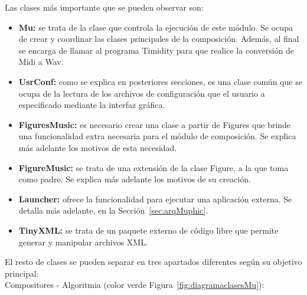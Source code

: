 Las clases más importante que se pueden observar son:

\begin{itemize}

	\item \textbf{Mu:} se trata de la clase que controla la ejecución de este módulo. Se ocupa de crear y coordinar las clases principales de la composición. Además, al final se encarga de llamar al programa Timidity para que realice la conversión de Midi a Wav.
	
	\item \textbf{UsrConf:} como se explica en posteriores secciones, es una clase común que se ocupa de la lectura de los archivos de configuración que el usuario a especificado mediante la interfaz gráfica.
	
	\item \textbf{FiguresMusic:} es necesario crear una clase a partir de Figures que brinde una funcionalidad extra necesaria para el módulo de composición. Se explica más adelante los motivos de esta necesidad.
	
	\item \textbf{FigureMusic:} se trata de una extensión de la clase Figure, a la que toma como padre. Se explica más adelante los motivos de su creación.

	\item \textbf{Launcher:} ofrece la funcionalidad para ejecutar una aplicación externa. Se detalla más adelante, en la Sección~\ref{sec:arqMuphic}.

	\item \textbf{TinyXML:} se trata de un paquete externo de código libre que permite generar y manipular archivos XML.

\end{itemize}

El resto de clases se pueden separar en tres apartados diferentes según su objetivo principal:\\

Compositores - Algoritmia (color verde Figura~\ref{fig:diagramaclasesMu}):

